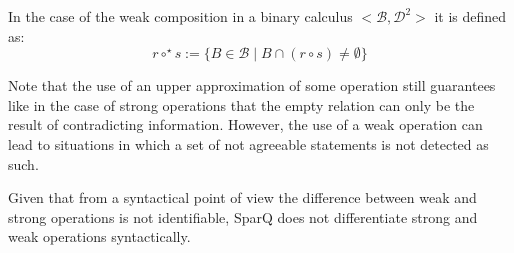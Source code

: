 \documentclass[headsepline]{scrreprt}
\theoremstyle{definition}
\newcommand{\engine}{SparQ}
\begin{document}
In the case of the weak  composition in a binary calculus $<\mathcal{B},\mathcal{D}^2>$ it is defined as:
$$
r \circ^{\star} s := \{ B \in \mathcal{B}\; |\; B \cap (r \circ s) \neq \emptyset \}
$$

Note that the use of an upper approximation of some operation still guarantees like in the case of strong operations that the empty relation can only be the result of contradicting information. However, the use of a weak operation can lead to situations in which a set of not agreeable statements is not detected as such.

Given that from a syntactical point of view the difference between weak and strong operations is not identifiable, \engine{} does not differentiate strong and weak operations syntactically.



%





\end{document}
